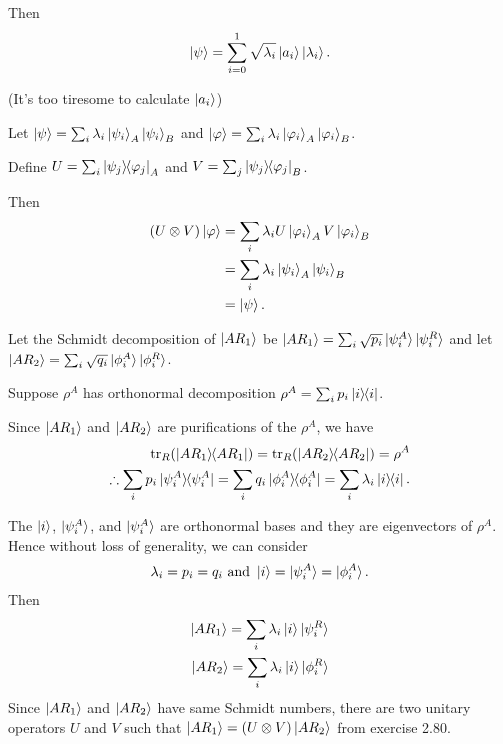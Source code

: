 Then
\begin{align*}
	\ket{\psi} = \sum_{i=0}^1 \sqrt{\lambda_i} \ket{a_i} \ket{\lambda_i}.
\end{align*}


(It's too tiresome to calculate $\ket{a_i}$)




Let $\ket{\psi} = \sum_i \lambda_i \ket{\psi_i}_A \ket{\psi_i}_B$ and $\ket{\varphi} = \sum_i \lambda_i \ket{\varphi_i}_A \ket{\varphi_i}_B$.

Define $U = \sum_i \ket{\psi_j}\hspace{-1mm} \bra{\varphi_j}_A$ and $V = \sum_j \ket{\psi_j}\hspace{-1mm} \bra{\varphi_j}_B$.

Then
\begin{align*}
	(U \otimes V) \ket{\varphi} &= \sum_i \lambda_i U \ket{\varphi_i}_A  V \ket{\varphi_i}_B\\
		&= \sum_i \lambda_i \ket{\psi_i}_A \ket{\psi_i}_B\\
		&= \ket{\psi}.
\end{align*}



Let the Schmidt decomposition of $\ket{AR_1}$ be $\ket{AR_1} = \sum_i \sqrt{p_i} \ket{\psi_i^A} \ket{\psi_i^R}$ and
let $\ket{AR_2} = \sum_i \sqrt{q_i} \ket{\phi_i^A} \ket{\phi_i^R}$.

Suppose $\rho^A$ has orthonormal decomposition $\rho^A = \sum_i p_i \ket{i}\hspace{-1mm} \bra{i}$.

Since $\ket{AR_1}$ and $\ket{AR_2}$ are purifications of the $\rho^A$, we have
%
\begin{align*}
    \operatorname{tr}_R (\ket{AR_1}\hspace{-1mm} \bra{AR_1}) = \operatorname{tr}_R (\ket{AR_2}\hspace{-1mm} \bra{AR_2}) = \rho^A\\
    \therefore \sum_i p_i \ket{\psi_i^A}\hspace{-1mm} \bra{\psi_i^A} = \sum_i q_i \ket{\phi_i^A}\hspace{-1mm} \bra{\phi_i^A} = \sum_i \lambda_i \ket{i}\hspace{-1mm} \bra{i}.
\end{align*}

The $\ket{i}$, $\ket{\psi_i^A}$, and $\ket{\psi_i^A}$ are orthonormal bases and they are eigenvectors of $\rho^A$.
Hence without loss of generality, we can consider
\begin{align*}
    \lambda_i = p_i = q_i \text{ and } \ket{i} = \ket{\psi_i^A} = \ket{\phi_i^A}.
\end{align*}
%
Then
\begin{align*}
    \ket{AR_1} = \sum_i \lambda_i \ket{i} \ket{\psi_i^R}\\
    \ket{AR_2} = \sum_i \lambda_i \ket{i} \ket{\phi_i^R}
\end{align*}
Since $\ket{AR_1}$ and $\ket{AR_2}$ have same Schmidt numbers, there are two unitary operators $U$ and $V$ such that
$\ket{AR_1} = (U \otimes V) \ket{AR_2}$ from exercise 2.80.

